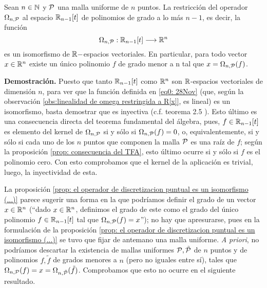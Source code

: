 \begin{prop}
\label{prop: el operador de discretizacion puntual es un isomorfismo (...)}
Sean $n \in \mathbb{N}$ y $\mathcal{P}$ 
una malla uniforme de $n$
puntos. 
La restricción del operador $\Omega_{n, \mathcal{P}}$
al espacio $\mathbb{R}_{n-1}[t]$ de polinomios de grado a lo más
$n-1$, es decir, la función 
\begin{equation}
\label{eq0: 28Nov}
\Omega_{n, \mathcal{P}}:
\mathbb{R}_{n-1}[t] \longrightarrow \mathbb{R}^{n}
\end{equation}
es un isomorfismo de $\mathbb{R}-$espacios vectoriales.
En particular, para todo vector $x \in \mathbb{R}^{n}$
existe un único polinomio $f$ de grado menor a n
tal que $x = \Omega_{n, \mathcal{P}}(f)$.
\end{prop}
\noindent
\textbf{Demostración.}
Puesto que tanto $\mathbb{R}_{n-1}[t]$
como $\mathbb{R}^{n}$ son $\mathbb{R}$-espacios vectoriales
de dimensión $n$, para ver que la función 
definida en
\eqref{eq0: 28Nov} (que, según la observación 
\ref{obs:linealidad de omega restringida a R[x]}, es lineal)
es un isomorfismo, basta
demostrar que es inyectiva 
(c.f. teorema 2.5 \cite{friedberg}).
Esto último es una consecuencia directa del 
teorema fundamental del álgebra,
pues, 
$f \in \mathbb{R}_{n-1}[t]$
es elemento del kernel
de $\Omega_{n, \mathcal{P}}$ si y sólo si 
$\Omega_{n, \mathcal{P}}(f)=0$, o, equivalentemente,
si y sólo si 
cada uno de los $n$ puntos que componen la
malla $\mathcal{P}$ es una raíz de $f$;
según la proposición
\ref{prop: consecuencia del TFA},
esto último ocurre si y sólo si $f$ es el polinomio cero.
Con esto comprobamos que el kernel de la aplicación
\label{eq1: 25Nov} es trivial, luego, la inyectividad
de esta.
\QEDB
\vspace{0.2cm}

La proposición
\ref{prop: el operador de discretizacion puntual es un isomorfismo (...)}
parece sugerir 
una forma en la que podríamos 
definir el grado de 
un vector $x \in \mathbb{R}^{n}$ (``dado $x \in \mathbb{R}^{n}$, definimos
el grado de este como el grado del único polinomio $f \in \mathbb{R}_{n-1}[t]$
tal que $\Omega_{n, \mathcal{P}}(f)=x$''); no hay
que apresurarse, pues en la formulación de
la proposición
\ref{prop: el operador de discretizacion puntual es un isomorfismo (...)}
se tuvo que fijar de antemano una malla uniforme.
\textit{A priori}, no podríamos descartar 
la existencia de mallas uniformes
$\mathcal{P}, \tilde{\mathcal{P}}$ 
de $n$ puntos
y de polinomios
$f, \tilde{f}$ de grados menores a $n$ (pero no 
iguales entre sí), tales que
$\Omega_{n, \mathcal{P}}(f) = x = \Omega_{n, \tilde{\mathcal{P}}}(\tilde{f})$.
Comprobamos que esto no ocurre
en el siguiente resultado.

